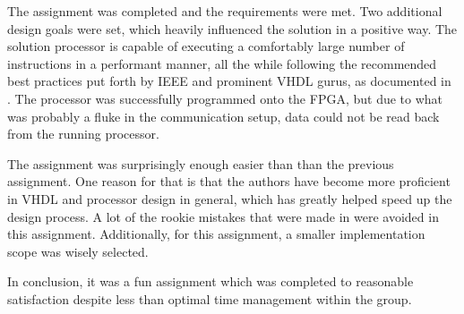 The assignment was completed and the requirements were met.
Two additional design goals were set, which heavily influenced the solution in a positive way.
The solution processor is capable of executing a comfortably large number of instructions in a performant manner, all the while following the recommended best practices put forth by IEEE and prominent VHDL gurus, as documented in \cite{assignment-1}.
The processor was successfully programmed onto the FPGA, but due to what was probably a fluke in the communication setup, data could not be read back from the running processor.

The assignment was surprisingly enough easier than than the previous assignment\cite{assignment-1}.
One reason for that is that the authors have become more proficient in VHDL and processor design in general, which has greatly helped speed up the design process.
A lot of the rookie mistakes that were made in \cite{assignment-1} were avoided in this assignment.
Additionally, for this assignment, a smaller implementation scope was wisely selected.

In conclusion, it was a fun assignment which was completed to reasonable satisfaction despite less than optimal time management within the group.
